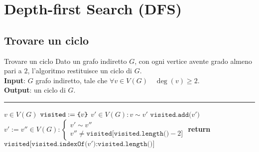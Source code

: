 \documentclass[a4paper, 12pt]{report}
\begin{document}
    \section{Depth-first Search (DFS)}

    \subsection{Trovare un ciclo}

    \begin{framedalgo}{Trovare un ciclo}
        Dato un grafo indiretto $G$, con ogni vertice avente grado almeno pari a $2$, l'algoritmo restituisce un ciclo di $G$.\\
        \textbf{Input}: $G$ grafo indiretto, tale che $\forall v \in V(G) \quad \deg(v) \ge 2$.\\
        \textbf{Output}: un ciclo di $G$.

        \hrule
        \begin{algorithmic}[1]
                \State $v \in V(G)$ 
                \State $\texttt{visited} := \verb|{|v\verb|}|$ 
                \State $v' \in V(G) : v \sim v'$
                 
                    \State $\texttt{visited.add(}v'\texttt{)}$
                    \State $v' := v'' \in V(G) : \left \{ \begin{array}{l}v' \sim v'' \\ v'' \neq \texttt{visited[visited.length()} - 2\texttt{]} \end{array} \right.$
                \EndWhile
                \State \textbf{return} $\texttt{visited[visited.indexOf(}v'\texttt{)} \texttt{:} \texttt{visited.length()]}$
            \EndFunction
        \end{algorithmic}
    \end{framedalgo}
\end{document}
